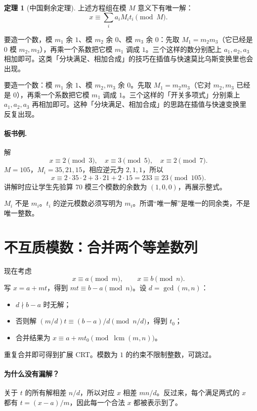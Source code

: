 \documentclass[UTF8,a4paper,11pt,twoside,openright,fontset=fandol]{ctexbook}
\theoremstyle{definition}
\newtheorem{theorem}[definition]{定理}
\newcommand{\lcm}{\operatorname{lcm}}
\begin{document}
\begin{theorem}[中国剩余定理]
上述方程组在模 $M$ 意义下有唯一解：
\[
 x\equiv\sum_i a_iM_it_i\pmod M.
\]
\end{theorem}

\begin{tip}
要造一个数，模 $m_1$ 余 $1$、模 $m_2$ 余 $0$、模 $m_3$ 余 $0$：先取 $M_1=m_2m_3$（它已经是 $0$ 模 $m_2,m_3$），再乘一个系数把它模 $m_1$ 调成 $1$。三个这样的数分别配上 $a_1,a_2,a_3$ 相加即可。这类「分块满足、相加合成」的技巧在插值与快速莫比乌斯变换里也会出现。
\end{tip}

\begin{tip}
要造一个数：模 $m_1$ 余 $1$、模 $m_2,m_3$ 余 $0$。先取 $M_1=m_2m_3$（它对 $m_2,m_3$ 已经是 $0$），再乘一个系数把它模 $m_1$ 调成 $1$。三个这样的「开关多项式」分别乘上 $a_1,a_2,a_3$ 再相加即可。这种「分块满足、相加合成」的思路在插值与快速变换里反复出现。
\end{tip}

\paragraph{板书例.} 解
\[
 x\equiv2\pmod3,\quad x\equiv3\pmod5,\quad x\equiv2\pmod7.
\]
$M=105$，$M_i=35,21,15$，相应逆元为 $2,1,1$，所以
\[
 x\equiv2\cdot35\cdot2+3\cdot21+2\cdot15=233\equiv23\pmod{105}.
\]
讲解时应让学生先验算 $70$ 模三个模数的余数为 $(1,0,0)$，再展示整式。
\begin{pitfall}
$M_i$ 不是 $m_i$。$t_i$ 的逆元模数必须写明为 $m_i$。所谓“唯一解”是唯一的同余类，不是唯一整数。
\end{pitfall}


\section{不互质模数：合并两个等差数列}
现在考虑
\[
 x\equiv a\pmod m,\qquad x\equiv b\pmod n.
\]
写 $x=a+mt$，得到 $mt\equiv b-a\pmod n$。设 $d=\gcd(m,n)$：
\begin{itemize}
\item $d\nmid b-a$ 时无解；
\item 否则解 $(m/d)t\equiv(b-a)/d\pmod{n/d}$，得到 $t_0$；
\item 合并结果为 $x\equiv a+mt_0\pmod{\lcm(m,n)}$。
\end{itemize}
重复合并即可得到扩展 CRT。模数为 $1$ 的约束不限制整数，可跳过。


\paragraph{为什么没有漏解？}
关于 $t$ 的所有解相差 $n/d$，所以对应 $x$ 相差 $mn/d$。反过来，每个满足两式的 $x$ 都有 $t=(x-a)/m$，因此每一个合法 $x$ 都被表示到了。
\end{document}
